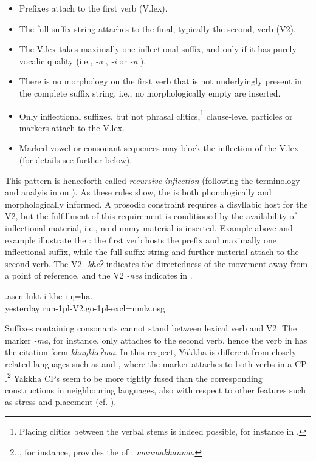 \begin{itemize}
\item Prefixes attach to the first verb (V.lex).
\item The full suffix string attaches to the final, typically the second, verb (V2).
\item The V.lex takes maximally one inflectional suffix, and only if it has purely vocalic quality (i.e., \emph{-a} , \emph{-i}  or \emph{-u} ).
\item There is no morphology on the first verb that is not underlyingly present in the complete suffix string, i.e., no morphologically empty  are inserted.
\item Only inflectional suffixes, but not phrasal clitics,\footnote{Placing clitics between the verbal stems is indeed possible, for instance in  \citep{Bickeletal2007Free}.} clause-level particles or  markers attach to the V.lex. 
\item Marked vowel or consonant sequences may block the inflection of the V.lex (for details see further below).
\end{itemize}

This pattern is henceforth called \emph{recursive inflection} (following the terminology and analyis in  \citealt{Bickeletal2007Free} on ). As these rules show, the  is both phonologically and morphologically informed. A prosodic constraint  requires a disyllabic host for the V2, but the fulfillment of this requirement is conditioned by the availability of inflectional material, i.e., no dummy material is inserted. Example \Last above and example  \Next illustrate the : the first verb hosts the prefix and maximally one inflectional suffix, while the full suffix string and further material attach to the second verb. The  V2 \emph{-kheʔ}  indicates the directedness of the movement away from a point of reference, and the V2 \emph{-nes}  indicates   in \Last. 

\exg.asen lukt-i-khe-i-ŋ=ha.\\
	yesterday run{\sc -1pl-V2.go-1pl-excl=nmlz.nsg}\\
 
Suffixes containing consonants cannot stand between lexical verb and V2. The  marker \emph{-ma}, for instance, only attaches to the second verb, hence the verb in \Last[b] has the citation form \emph{khuŋkheʔma}. In this respect, Yakkha is different from closely related languages  such as  and , where the  marker attaches to both verbs in a CP \citep{Doornenbal2009A-grammar, Bickeletal2006The-Chintang}.\footnote{\citet[255]{Doornenbal2009A-grammar}, for instance, provides  the  of : \emph{manmakhanma}.} Yakkha CPs seem to be more tightly fused than the corresponding constructions in neighbouring languages, also with respect to other features such as stress and  placement (cf. ). 


